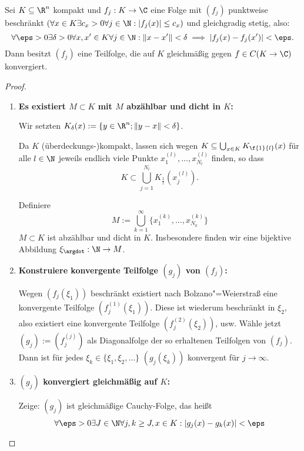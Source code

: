 \begin{st} \label{1.29}
	Sei $K \subset \R^n$ kompakt und $f_j : K \to \C$ eine Folge mit $(f_j)$ punktweise beschränkt $(\forall x \in K \exists c_x >0 \forall j\in \N : |f_j(x)|\le c_x)$ und gleichgradig stetig, also:
	\[
		\forall \eps > 0 \exists \delta > 0 \forall x,x' \in K \forall j \in \N : \|x-x'\| < \delta \implies |f_j(x)-f_j(x')| < \eps.
	\]
	Dann besitzt $(f_j)$ eine Teilfolge, die auf $K$ gleichmäßig gegen $f\in C(K \to \C)$ konvergiert.
	\begin{proof}
		\begin{enumerate}[1)]
			\item
				\textbf{Es existiert $M \subset K$ mit $M$ abzählbar und dicht in $K$:}
				
				  Wir setzten $ K_\delta(x):= \{y\in \R^n; \|y-x\|<\delta \} $.
				
				  Da $ K $ (überdeckungs-)kompakt, lassen sich wegen $ K\subset \bigcup_{x\in K} K_{\f{1}{l}}(x) $ für alle $ l\in \N $ jeweils endlich viele Punkte $ x_1^{(l)},..., x^{(l)}_{N_l} $ finden, so dass 
				  \[
				  K\subset \bigcup_{j=1}^{N_l} K_{\frac{1}{l}}(x_j^{(l)}).
				  \]
					
					Definiere
					\[
						M := \bigcup_{k=1}^\infty \Big\{x_1^{(k)}, \dotsc, x_{N_k}^{(k)}\Big\} 
					\]
					$M \subset K$ ist abzählbar und dicht in $K$. 
					Insbesondere finden wir eine bijektive Abbildung $ \xi_\argdot: \N \to M $.
				
			\item
				\textbf{Konstruiere konvergente Teilfolge $(g_j)$ von $(f_j)$:}
				
					Wegen $(f_j(\xi_1))$ beschränkt existiert nach Bolzano"=Weierstraß eine konvergente Teilfolge $(f_j^{(1)}(\xi_1))$.
					Diese ist wiederum beschränkt in $\xi_2$, also existiert eine konvergente Teilfolge $(f_j^{(2)}(\xi_2))$, usw.
					Wähle jetzt $(g_j) := (f_j^{(j)})$ als Diagonalfolge der so erhaltenen Teilfolgen von $(f_j)$.
					Dann ist für jedes $\xi_k \in \{\xi_1, \xi_2, \dotsc\}$ $(g_j(\xi_k))$ konvergent für $j \to \infty$.
			\item
				\textbf{$(g_j)$ konvergiert gleichmäßig auf $K$:}
				
					Zeige: $(g_j)$ ist gleichmäßige Cauchy-Folge, das heißt
					\[
						\forall \eps > 0 \exists J \in \N \forall j,k \ge J, x \in K : |g_j(x) - g_k(x)| < \eps
					\]


\end{enumerate}
\end{proof}
\end{st}
